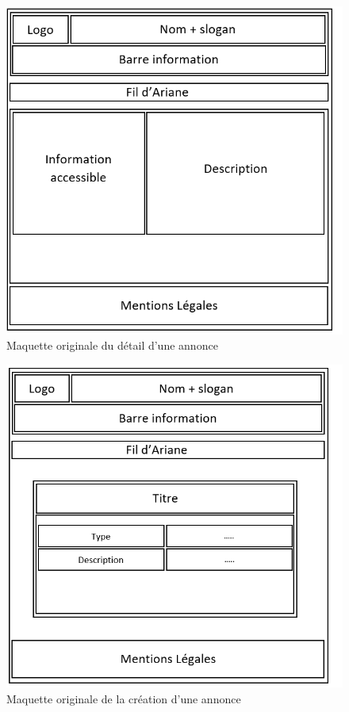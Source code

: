 \documentclass[a4paper,11pt]{article}
\begin{document}
\begin{figure}[H]
  \includegraphics[width=\linewidth]{images/maquette-detail-annonce-original.png}
  \caption{Maquette originale du détail d'une annonce}
  \label{fig:maquette-detail-annonce-original}
\end{figure}

\begin{figure}[H]
  \includegraphics[width=\linewidth]{images/maquette-creation-annonce-original.png}
  \caption{Maquette originale de la création d'une annonce}
  \label{fig:maquette-creation-annonce-original}
\end{figure}
\newpage
\end{document}
